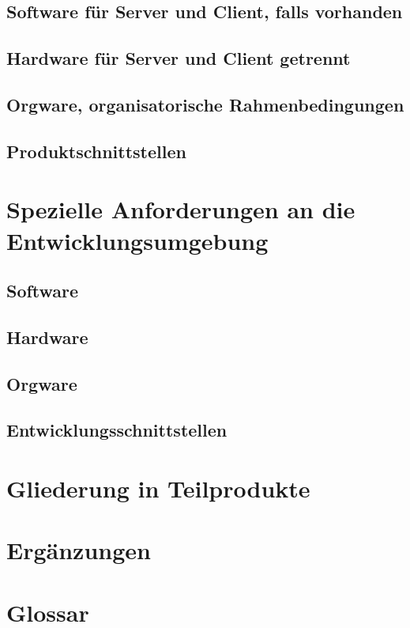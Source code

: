 \documentclass[a4paper,11pt]{article}             %
\begin{document}
	\subsection{Software für Server und Client, falls vorhanden}
	\subsection{Hardware für Server und Client getrennt}
	\subsection{Orgware, organisatorische Rahmenbedingungen}
	\subsection{Produktschnittstellen}
\section{Spezielle Anforderungen an die Entwicklungsumgebung}
	\subsection{Software}
	\subsection{Hardware}
	\subsection{Orgware}
	\subsection{Entwicklungsschnittstellen}
\section{Gliederung in Teilprodukte}
\section{Ergänzungen}
\section{Glossar}
\end{document}
